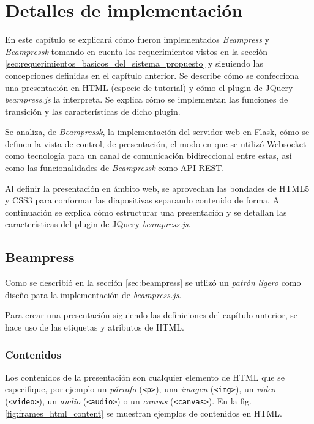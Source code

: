 \chapter{Detalles de implementación} %
\label{cha:detalles_de_implementacion}
	En este capítulo se explicará cómo fueron implementados \textit{Beampress} y \textit{Beampressk} tomando en cuenta los requerimientos vistos en la sección \ref{sec:requerimientos_basicos_del_sistema_propuesto} y siguiendo las concepciones definidas en el capítulo anterior. Se describe cómo se confecciona una presentación en HTML (especie de tutorial) y cómo el plugin de JQuery \textit{beampress.js} la interpreta. Se explica cómo se implementan las funciones de transición y las características de dicho plugin.

	Se analiza, de \textit{Beampressk}, la implementación del servidor web en Flask, cómo se definen la vista de control, de presentación, el modo en que se utilizó Websocket como tecnología para un canal de comunicación bidireccional entre estas, así como las funcionalidades de \textit{Beampressk} como API REST.

	Al definir la presentación en ámbito web, se aprovechan las bondades de HTML5 y CSS3 para conformar las diapositivas separando contenido de forma. A continuación se explica cómo estructurar una presentación y se detallan las características del plugin de JQuery \textit{beampress.js}. 

	\section{Beampress} %
	\label{sec:beampress_imp}
	

		Como se describió en la sección \ref{sec:beampress} se utlizó un  \textit{patrón ligero} como diseño para la implementación de \textit{beampress.js}. 

		Para crear una presentación siguiendo las definiciones del capítulo anterior, se hace uso de las etiquetas y atributos de HTML.


		\subsection{Contenidos} %
		\label{sub:contenidos}
			Los contenidos de la presentación son cualquier elemento de HTML que se especifique, por ejemplo un \textit{párrafo} (\texttt{<p>}), una \textit{imagen} (\texttt{<img>}), un \textit{video} (\texttt{<video>}), un \textit{audio} (\texttt{<audio>}) o un \textit{canvas} (\texttt{<canvas>}). En la fig. \ref{fig:frames_html_content} se muestran ejemplos de contenidos en HTML.

